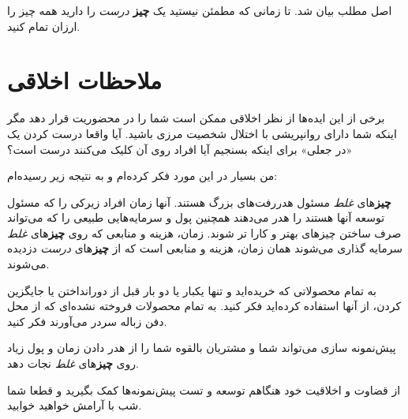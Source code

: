 اصل مطلب بیان شد. تا زمانی که مطمئن نیستید یک \textbf{چیز} \emph{درست}
را دارید همه چیز را ارزان تمام کنید.

\section{ملاحظات
اخلاقی}\label{ux645ux644ux627ux62dux638ux627ux62a-ux627ux62eux644ux627ux642ux6cc}

برخی از این ایده‌ها از نظر اخلاقی ممکن است شما را در محضوریت قرار دهد
مگر اینکه شما دارای روانپریشی با اختلال شخصیت مرزی باشید. آیا واقعا درست
کردن یک «در جعلی» برای اینکه بسنجیم آیا افراد روی آن کلیک می‌کنند درست
است؟

من بسیار در این مورد فکر کرده‌ام و به نتیجه زیر رسیده‌ام:

\textbf{چیز}های \emph{غلط} مسئول هدررفت‌های بزرگ هستند. آنها زمان افراد
زیرکی را که مسئول توسعه آنها هستند را هدر می‌دهند همچنین پول و
سرمایه‌هایی طبیعی را که می‌تواند صرف ساختن چیزهای بهتر و کارا تر شوند.
زمان، هزینه و منابعی که روی \textbf{چیز}های \emph{غلط} سرمایه گذاری
می‌شوند همان زمان، هزینه و منابعی است که از \textbf{چیز}های \emph{درست}
دزدیده می‌شوند.

به تمام محصولاتی که خریده‌اید و تنها یکبار یا دو بار قبل از دورانداختن
یا جایگزین کردن، از آنها استفاده کرده‌اید فکر کنید. به تمام محصولات
فروخته نشده‌ای که از محل دفن زباله سردر می‌آورند فکر کنید.

پیش‌نمونه سازی می‌تواند شما و مشتریان بالقوه شما را از هدر دادن زمان و
پول زیاد روی \textbf{چیز}های \emph{غلط} نجات دهد.

از قضاوت و اخلاقیت خود هنگاهم توسعه و تست پیش‌نمونه‌ها کمک بگیرید و قطعا
شما شب با آرامش خواهید خوابید.
